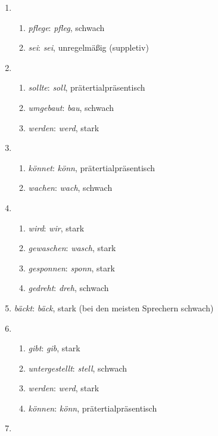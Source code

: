 
\begin{enumerate}\Lf
  \item
    \begin{enumerate}\Lf
      \item \textit{pflege}: \textit{pfleg}, schwach
      \item \textit{sei}: \textit{sei}, unregelmäßig (suppletiv)
    \end{enumerate}
  \item
    \begin{enumerate}\Lf
      \item \textit{sollte}: \textit{soll}, prätertialpräsentisch
      \item \textit{umgebaut}: \textit{bau}, schwach
      \item \textit{werden}: \textit{werd}, stark
    \end{enumerate}
  \item
    \begin{enumerate}\Lf
      \item \textit{könnet}: \textit{könn}, prätertialpräsentisch
      \item \textit{wachen}: \textit{wach}, schwach
    \end{enumerate}
  \item
    \begin{enumerate}\Lf
      \item \textit{wird}: \textit{wir}, stark
      \item \textit{gewaschen}: \textit{wasch}, stark
      \item \textit{gesponnen}: \textit{sponn}, stark
      \item \textit{gedreht}: \textit{dreh}, schwach
    \end{enumerate}
  \item \textit{bäckt}: \textit{bäck}, stark (bei den meisten Sprechern schwach)
  \item
    \begin{enumerate}\Lf
      \item \textit{gibt}: \textit{gib}, stark
      \item \textit{untergestellt}: \textit{stell}, schwach
      \item \textit{werden}: \textit{werd}, stark
      \item \textit{können}: \textit{könn}, prätertialpräsentisch
    \end{enumerate}
  \item
    \begin{enumerate}\Lf

\end{enumerate}
\end{enumerate}

